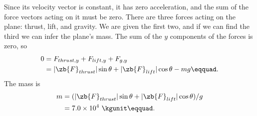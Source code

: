 Since its velocity vector is constant, it has zero
acceleration, and the sum of the force vectors acting on it
must be zero. There are three forces acting on the plane:
thrust, lift, and gravity. We are given the first two, and
if we can find the third we can infer the plane's mass. The sum of
the $y$ components of the forces is zero, so
\begin{align*}
	0	&= F_{thrust,y} +F_{lift,y} +F_{g,y} \\
		&= |\zb{F}_{thrust}| \sin \theta + |\zb{F}_{lift}| \cos \theta - mg\eqquad.
\end{align*}
The mass is
\begin{align*}
	m	&= (|\zb{F}_{thrust}| \sin \theta + |\zb{F}_{lift}| \cos \theta) / g \\
		&= 7.0\times10^4\ \kgunit\eqquad.
\end{align*}
